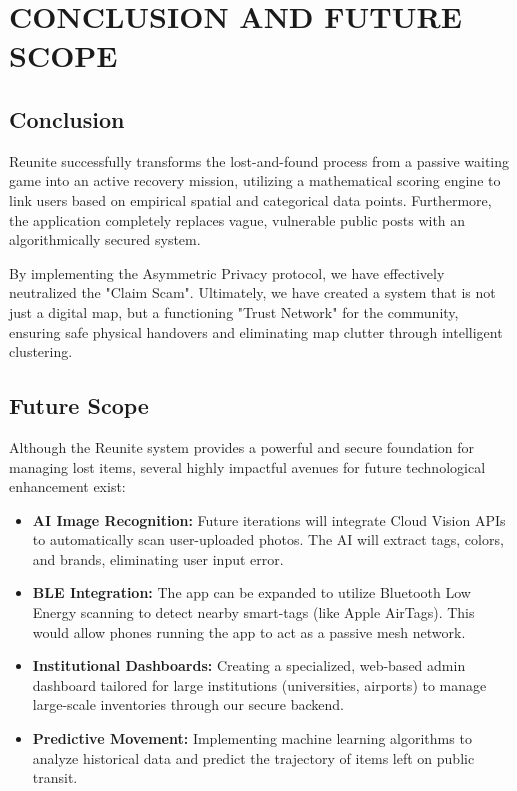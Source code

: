 \documentclass[12pt,a4paper]{report}
\begin{document}
\chapter{CONCLUSION AND FUTURE SCOPE}

\section{Conclusion}
Reunite successfully transforms the lost-and-found process from a passive waiting game into an active recovery mission, utilizing a mathematical scoring engine to link users based on empirical spatial and categorical data points. Furthermore, the application completely replaces vague, vulnerable public posts with an algorithmically secured system. 

By implementing the Asymmetric Privacy protocol, we have effectively neutralized the "Claim Scam". Ultimately, we have created a system that is not just a digital map, but a functioning "Trust Network" for the community, ensuring safe physical handovers and eliminating map clutter through intelligent clustering.

\section{Future Scope}
Although the Reunite system provides a powerful and secure foundation for managing lost items, several highly impactful avenues for future technological enhancement exist:
\begin{itemize}
    \setlength{\itemsep}{0pt} %
    \item \textbf{AI Image Recognition:} Future iterations will integrate Cloud Vision APIs to automatically scan user-uploaded photos. The AI will extract tags, colors, and brands, eliminating user input error.
    \item \textbf{BLE Integration:} The app can be expanded to utilize Bluetooth Low Energy scanning to detect nearby smart-tags (like Apple AirTags). This would allow phones running the app to act as a passive mesh network.
    \item \textbf{Institutional Dashboards:} Creating a specialized, web-based admin dashboard tailored for large institutions (universities, airports) to manage large-scale inventories through our secure backend.
    \item \textbf{Predictive Movement:} Implementing machine learning algorithms to analyze historical data and predict the trajectory of items left on public transit.
\end{itemize}
\end{document}
